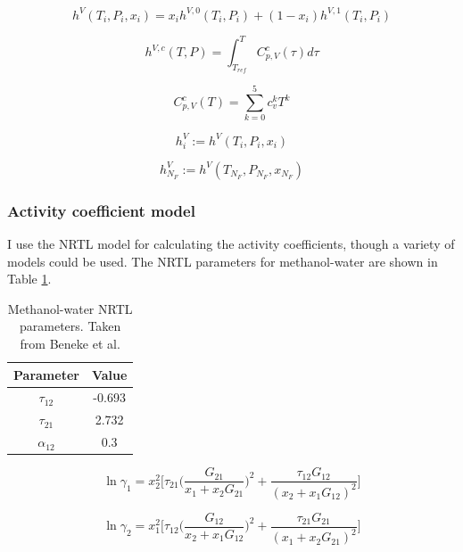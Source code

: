 \begin{equation}
    h^V(T_i, P_i, x_i) = x_i h^{V,0}(T_i,P_i) + (1-x_i) h^{V,1}(T_i,P_i)
\end{equation}

\begin{equation}
    h^{V,c}(T,P) = \int_{T_{ref}}^T C_{p,V}^c(\tau)d\tau 
\end{equation}

\begin{equation}
    C_{p,V}^c(T) = \sum_{k=0}^5 c_v^kT^k 
\end{equation}

\begin{equation}
    h^V_i := h^V(T_i, P_i,x_i)
\end{equation}

\begin{equation}
    h^V_{N_F} := h^V(T_{N_F}, P_{N_F},x_{N_F})
\end{equation}


\subsubsection{Activity coefficient model}

I use the NRTL model for calculating the activity coefficients, though a variety of models could be used. The NRTL parameters for methanol-water are shown in Table \ref{tab:nrtl_parameters}.

\begin{table}[]
    \centering
    \caption{Methanol-water NRTL parameters. Taken from Beneke et al.\cite{Beneke2012}}
    \begin{tabular}{cc}
        Parameter & Value \\
        \hline
         $\tau_{12}$ & -0.693  \\
         $\tau_{21}$ & 2.732   \\
         $\alpha_{12}$ & 0.3 \\
    \end{tabular}
    \label{tab:nrtl_parameters}
\end{table}

\begin{equation}
    \ln \gamma_{1} = x_2^2\biggl [\tau_{21} \biggl (\frac{G_{21}}{x_1+x_2G_{21}}\biggr)^2 + \frac{\tau_{12}G_{12}}{(x_2 + x_1 G_{12})^2} \biggr ]
\end{equation}

\begin{equation}
     \ln \gamma_{2} = x_1^2\biggl [\tau_{12} \biggl (\frac{G_{12}}{x_2+x_1G_{12}}\biggr)^2 + \frac{\tau_{21}G_{21}}{(x_1 + x_2 G_{21})^2} \biggr ]   
\end{equation}


